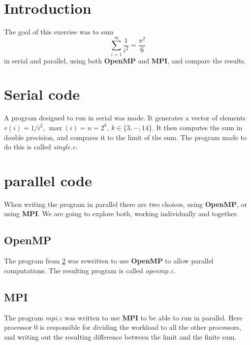 \section{Introduction}
The goal of this exercise was to sum
$$ \sum \limits_{i = 1}^{\infty} \frac{1}{i^2}= \frac{\pi^2}{6}$$
in serial and parallel, using both \textbf{OpenMP} and \textbf{MPI}, and compare the results.


\section{Serial code} \label{serial}
A program designed to run in serial was made. It generates a vector of elements $v(i) = 1/i^2$, $\max(i) =n= 2^k$, $k \in\{3,\cdots ,14\}$. It then computes the sum in double precision, and compares it to the limit of the sum. The program made to do this is called \textit{single.c}. %


\section{parallel code}
When writing the program in parallel there are two choices, using \textbf{OpenMP}, or using \textbf{MPI}. We are going to explore both, working individually and together.
\subsection{OpenMP}
The program from \ref{serial} was rewritten to use \textbf{OpenMP} to allow parallel computations. The resulting program is called \textit{openmp.c}.%



\subsection{MPI}
The program \textit{mpi.c} was written to use \textbf{MPI} to be able to run in parallel. Here processor $0$ is responsible for dividing the workload to all the other processors, and writing out the resulting difference between the limit and the finite sum. %

